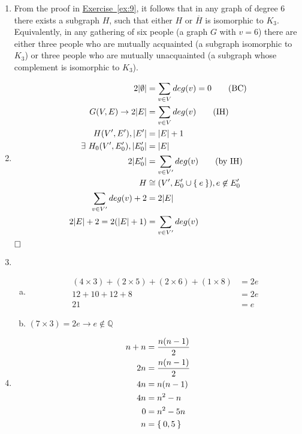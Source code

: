 \documentclass[nobib]{tufte-book}
\DeclarePairedDelimiter\abs{\lvert}{\rvert}
\begin{document}
\begin{enumerate}
    \item From the proof in \hyperref[ex:9]{Exercise~\ref{ex:9}}, it follows
      that in any graph of degree $6$ there exists a subgraph $H$, such that
      either $H$ or $\overline{H}$ is isomorphic to $K_{3}$. Equivalently, in
      any gathering of six people (a graph $G$ with $v=6$) there are either
      three people who are mutually acquainted (a subgraph isomorphic to
      $K_{3}$) or three people who are mutually unacquainted (a subgraph whose
      complement is isomorphic to $K_{3}$).

    \item
      \begin{align}
        2\abs{\emptyset} &= \sum_{v \in V} deg(v) = 0 \tag{BC} \\
        G(V,E) \to 2\abs{E} &= \sum_{v \in V} deg(v) \tag{IH} \\
        H(V^{\prime}, E^{\prime}), \abs{E^{\prime}} &= \abs{E} + 1 \\
        \exists\ H_{0}(V^{\prime}, E^{\prime}_{0}), \abs{E^{\prime}_{0}} &= \abs{E} \\
        2\abs{E^{\prime}_{0}} &= \sum_{v \in V^{\prime}} deg(v) \tag{by IH}\\
        H &\cong (V^{\prime}, E_{0}^{\prime} \cup \Set{e}), e \not\in E_{0}^{\prime} \\
        \sum_{v \in V^{\prime}} deg(v) + 2 &= 2\abs{E} \\
        2\abs{E} + 2 = 2(\abs{E} + 1) &= \sum_{v \in V^{\prime}} deg(v)
      \end{align}
      $\hfill\square$

    \item
      \begin{enumerate}[a)]
      \item
        \begin{align*}
          (4 \times 3) + (2 \times 5) + (2 \times 6) + (1 \times 8) &= 2e \\
          12 + 10 + 12 + 8 &= 2e \\
          21 &= e
        \end{align*}
      \item $(7 \times 3) = 2e \to e \not\in \mathbb{Q}$
      \end{enumerate}
    \item
      \begin{marginfigure}
        \begin{align*}
          n + n &= \frac{n(n-1)}{2} \\
          2n &= \frac{n(n - 1)}{2} \\
          4n &= n(n-1) \\
          4n &= n^{2} - n \\
          0 &= n^{2} - 5n \\
          n &= \Set{0,5}
        \end{align*}
      \end{marginfigure}


\end{enumerate}
\end{document}
